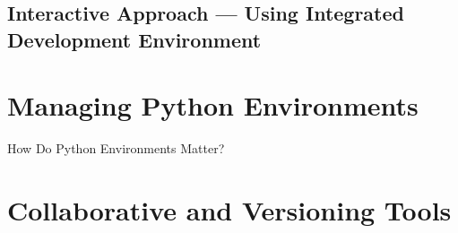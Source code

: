 \documentclass[aspectratio=1610]{beamer}
\begin{document}
\subsection{Interactive Approach --- Using Integrated Development Environment}

\section{Managing Python Environments}

\begin{frame}{How Do Python Environments Matter?}
\end{frame}

\section{Collaborative and Versioning Tools}
\end{document}
